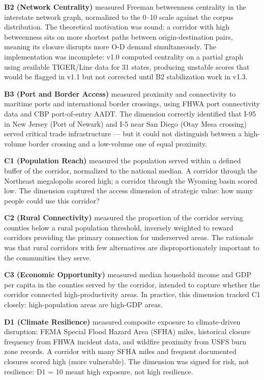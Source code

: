 \textbf{B2 (Network Centrality)} measured Freeman betweenness centrality in the interstate network graph, normalized to the 0--10 scale against the corpus distribution. The theoretical motivation was sound: a corridor with high betweenness sits on more shortest paths between origin-destination pairs, meaning its closure disrupts more O-D demand simultaneously. The implementation was incomplete: v1.0 computed centrality on a partial graph using available TIGER/Line data for 31 states, producing unstable scores that would be flagged in v1.1 but not corrected until B2 stabilization work in v1.3.

\textbf{B3 (Port and Border Access)} measured proximity and connectivity to maritime ports and international border crossings, using FHWA port connectivity data and CBP port-of-entry AADT. The dimension correctly identified that I-95 in New Jersey (Port of Newark) and I-5 near San Diego (Otay Mesa crossing) served critical trade infrastructure --- but it could not distinguish between a high-volume border crossing and a low-volume one of equal proximity.

\textbf{C1 (Population Reach)} measured the population served within a defined buffer of the corridor, normalized to the national median. A corridor through the Northeast megalopolis scored high; a corridor through the Wyoming basin scored low. The dimension captured the access dimension of strategic value: how many people could use this corridor?

\textbf{C2 (Rural Connectivity)} measured the proportion of the corridor serving counties below a rural population threshold, inversely weighted to reward corridors providing the primary connection for underserved areas. The rationale was that rural corridors with few alternatives are disproportionately important to the communities they serve.

\textbf{C3 (Economic Opportunity)} measured median household income and GDP per capita in the counties served by the corridor, intended to capture whether the corridor connected high-productivity areas. In practice, this dimension tracked C1 closely: high-population areas are high-GDP areas.

\textbf{D1 (Climate Resilience)} measured composite exposure to climate-driven disruption: FEMA Special Flood Hazard Area (SFHA) miles, historical closure frequency from FHWA incident data, and wildfire proximity from USFS burn zone records. A corridor with many SFHA miles and frequent documented closures scored high (more vulnerable). The dimension was signed for risk, not resilience: D1 = 10 meant high exposure, not high resilience.

